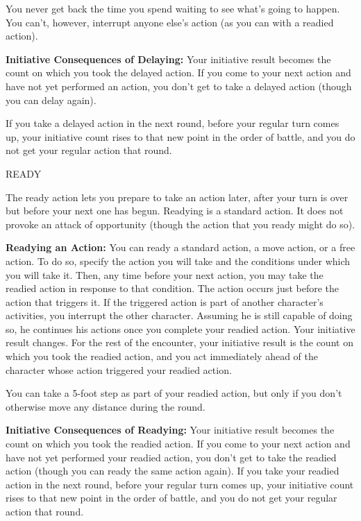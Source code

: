 \documentclass{article}
\begin{document}
You never get back the time you spend waiting to see what's going to happen. You 
can't, however, interrupt anyone else's action (as you can with a readied action).

\textbf{Initiative Consequences of Delaying: }Your initiative result becomes the 
count on which you took the delayed action. If you come to your next action and 
have not yet performed an action, you don't get to take a delayed action (though 
you can delay again).

If you take a delayed action in the next round, before your regular turn comes 
up, your initiative count rises to that new point in the order of battle, and you 
do not get your regular action that round.

\vspace{12pt}
READY

The ready action lets you prepare to take an action later, after your turn is over 
but before your next one has begun. Readying is a standard action. It does not 
provoke an attack of opportunity (though the action that you ready might do so).

\textbf{Readying an Action:} You can ready a standard action, a move action, or 
a free action. To do so, specify the action you will take and the conditions under 
which you will take it. Then, any time before your next action, you may take the 
readied action in response to that condition. The action occurs just before the 
action that triggers it. If the triggered action is part of another character's 
activities, you interrupt the other character. Assuming he is still capable of 
doing so, he continues his actions once you complete your readied action. Your 
initiative result changes. For the rest of the encounter, your initiative result 
is the count on which you took the readied action, and you act immediately ahead 
of the character whose action triggered your readied action.

You can take a 5-foot step as part of your readied action, but only if you don't 
otherwise move any distance during the round. 

\textbf{Initiative Consequences of Readying:} Your initiative result becomes the 
count on which you took the readied action. If you come to your next action and 
have not yet performed your readied action, you don't get to take the readied action 
(though you can ready the same action again). If you take your readied action in 
the next round, before your regular turn comes up, your initiative count rises 
to that new point in the order of battle, and you do not get your regular action 
that round.
\end{document}
